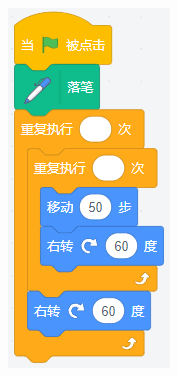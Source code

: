 \documentclass[10pt, a4paper]{article}
\begin{document}
\begin{enumerate}
\begin{figure}[htbp]
\begin{minipage}[t]{.26\textwidth}
\begin{minipage}[t]{.4\textwidth}
                    \includegraphics[width=\textwidth]{figure/24-2.png}

\end{minipage}
\end{minipage}
\end{figure}
\end{enumerate}
\end{document}
